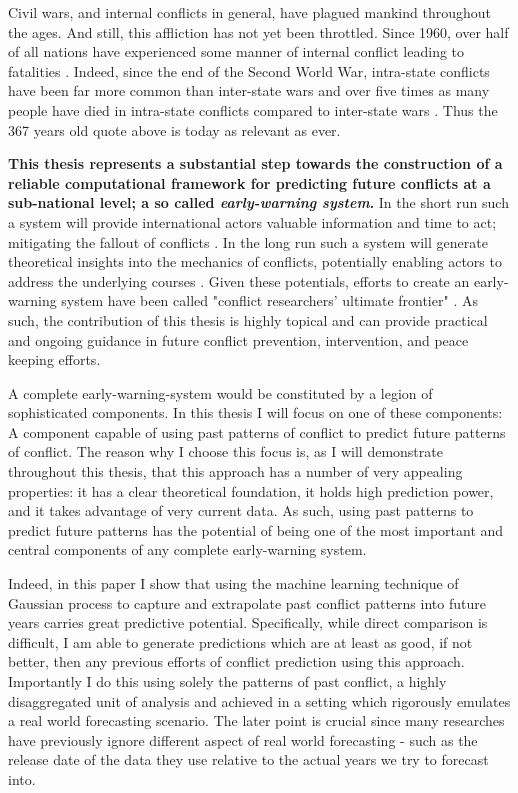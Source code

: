 \documentclass[a4paper]{article}
\begin{document}
Civil wars, and internal conflicts in general, have plagued mankind throughout the ages. And still, this affliction has not yet been throttled. Since 1960, over half of all nations have experienced some manner of internal conflict leading to fatalities \citep[3-4]{Blattman_Miguel_2010}. Indeed, since the end of the Second World War, intra-state conflicts have been far more common than inter-state wars and over five times as many people have died in intra-state conflicts compared to inter-state wars \citep[563]{Collier_Hoeffler_2004}. Thus the 367 years old quote above is today as relevant as ever.\par

\textbf{This thesis represents a substantial step towards the construction of a reliable computational framework for predicting future conflicts at a sub-national level; a so called \emph{early-warning system}.} In the short run such a system will provide international actors valuable information and time to act; mitigating the fallout of conflicts \citep{Ward_Greenhill_Bakke_2010, perry_2013}. In the long run such a system will generate theoretical insights into the mechanics of conflicts, potentially enabling actors to address the underlying courses \citep{Schrodt_2014, chadefaux2017conflict}. Given these potentials, efforts to create an early-warning system have been called "conflict researchers’ ultimate frontier" \citep[474]{cederman2017predicting}. As such, the contribution of this thesis is highly topical and can provide practical and ongoing guidance in future conflict prevention, intervention, and peace keeping efforts.\par

A complete early-warning-system would be constituted by a legion of sophisticated components. In this thesis I will focus on one of these components: A component capable of using past patterns of conflict to predict future patterns of conflict. The reason why I choose this focus is, as I will demonstrate throughout this thesis, that this approach has a number of very appealing properties: it has a clear theoretical foundation, it holds high prediction power, and it takes advantage of very current data. As such, using past patterns to predict future patterns has the potential of being one of the most important and central components of any complete early-warning system.\par

Indeed, in this paper I show that using the machine learning technique of Gaussian process to capture and extrapolate past conflict patterns into future years carries great predictive potential. Specifically, while direct comparison is difficult, I am able to generate predictions which are at least as good, if not better, then any previous efforts of conflict prediction using this approach. Importantly I do this using solely the patterns of past conflict, a highly disaggregated unit of analysis and achieved in a setting which rigorously emulates a real world forecasting scenario. The later point is crucial since many researches have previously ignore different aspect of real world forecasting - such as the release date of the data they use relative to the actual years we try to forecast into.\par
\end{document}
